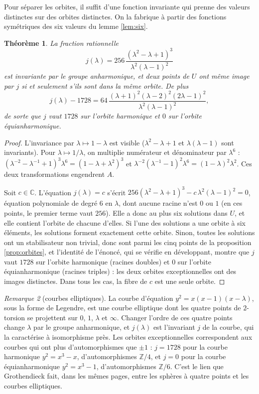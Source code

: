 \documentclass[11pt,a4paper]{article}
\theoremstyle{plain}
\newtheorem{theoreme}{Théorème}[section]
\theoremstyle{definition}
\theoremstyle{remark}
\newtheorem{remarque}[theoreme]{Remarque}
\newcommand{\C}{\mathbb{C}}
\newcommand{\Z}{\mathbb{Z}}
\begin{document}
Pour séparer les orbites, il suffit d'une fonction invariante qui prenne des valeurs distinctes sur des orbites distinctes. On la fabrique à partir des fonctions symétriques des six valeurs du lemme \ref{lem:six}.

\begin{theoreme}\label{thm:j}
La fraction rationnelle
\[
  j(\lambda)=256\,\frac{(\lambda^2-\lambda+1)^3}{\lambda^2(\lambda-1)^2}
\]
est invariante par le groupe anharmonique, et deux points de $U$ ont même image par $j$ si et seulement s'ils sont dans la même orbite. De plus
\[
  j(\lambda)-1728=64\,\frac{(\lambda+1)^2(\lambda-2)^2(2\lambda-1)^2}{\lambda^2(\lambda-1)^2},
\]
de sorte que $j$ vaut $1728$ sur l'orbite harmonique et $0$ sur l'orbite équianharmonique.
\end{theoreme}

\begin{proof}
L'invariance par $\lambda\mapsto1-\lambda$ est visible ($\lambda^2-\lambda+1$ et $\lambda(\lambda-1)$ sont invariants). Pour $\lambda\mapsto1/\lambda$, on multiplie numérateur et dénominateur par $\lambda^6$ : $(\lambda^{-2}-\lambda^{-1}+1)^3\lambda^6=(1-\lambda+\lambda^2)^3$ et $\lambda^{-2}(\lambda^{-1}-1)^2\lambda^6=(1-\lambda)^2\lambda^2$. Ces deux transformations engendrent $A$.

Soit $c\in\C$. L'équation $j(\lambda)=c$ s'écrit $256(\lambda^2-\lambda+1)^3-c\,\lambda^2(\lambda-1)^2=0$, équation polynomiale de degré $6$ en $\lambda$, dont aucune racine n'est $0$ ou $1$ (en ces points, le premier terme vaut $256$). Elle a donc au plus six solutions dans $U$, et elle contient l'orbite de chacune d'elles. Si l'une des solutions a une orbite à six éléments, les solutions forment exactement cette orbite. Sinon, toutes les solutions ont un stabilisateur non trivial, donc sont parmi les cinq points de la proposition \ref{prop:orbites}, et l'identité de l'énoncé, qui se vérifie en développant, montre que $j$ vaut $1728$ sur l'orbite harmonique (racines doubles) et $0$ sur l'orbite équianharmonique (racines triples) : les deux orbites exceptionnelles ont des images distinctes. Dans tous les cas, la fibre de $c$ est une seule orbite.
\end{proof}

\begin{remarque}[courbes elliptiques]
La courbe d'équation $y^2=x(x-1)(x-\lambda)$, sous la forme de Legendre, est une courbe elliptique dont les quatre points de $2$-torsion se projettent sur $0$, $1$, $\lambda$ et $\infty$. Changer l'ordre de ces quatre points change $\lambda$ par le groupe anharmonique, et $j(\lambda)$ est l'invariant $j$ de la courbe, qui la caractérise à isomorphisme près. Les orbites exceptionnelles correspondent aux courbes qui ont plus d'automorphismes que $\pm1$ : $j=1728$ pour la courbe harmonique $y^2=x^3-x$, d'automorphismes $\Z/4$, et $j=0$ pour la courbe équianharmonique $y^2=x^3-1$, d'automorphismes $\Z/6$. C'est le lien que Grothendieck fait, dans les mêmes pages, entre les sphères à quatre points et les courbes elliptiques.
\end{remarque}
\end{document}
